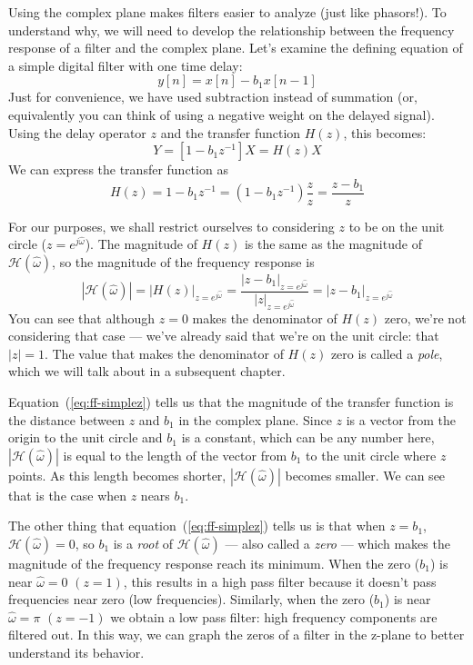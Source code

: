 Using the complex plane makes filters easier to analyze (just like phasors!). To understand why, we will need to develop the relationship between the frequency response of a filter and the complex plane. Let's examine the defining equation of a simple digital filter with
one time delay:
\begin{equation}
y[n] = x[n]-b_1x[n-1]
\end{equation}
Just for convenience, we have used subtraction instead of summation
(or, equivalently you can think of using a negative weight on the
delayed signal). Using the delay operator $z$ and the transfer
function $H(z)$, this becomes:
\begin{equation}
Y = [1-b_1z^{-1}]X = H(z)X
\end{equation}
We can express the transfer function as
\begin{equation}
H(z) = 1-b_1z^{-1} = (1-b_1z^{-1}) \frac{z}{z} = \frac{z-b_1}{z}
\end{equation}

For our purposes, we shall restrict ourselves to considering $z$ to be
on the unit circle ($z=e^{j\hat{\omega}}$). The magnitude of $H(z)$ is
the same as the magnitude of $\mathcal{H}(\hat{\omega})$, so the
magnitude of the frequency response is
\begin{equation}
|\mathcal{H}(\hat{\omega})| = |H(z)|_{z=e^{j\hat{\omega}}}
       = \frac{|z-b_1|_{z=e^{j\hat{\omega}}}}{|z|_{z=e^{j\hat{\omega}}}}
       = |z-b_1|_{z=e^{j\hat{\omega}}}
\label{eq:ff-simplez}
\end{equation}
You can see that
although $z=0$ makes the denominator of $H(z)$ zero, we're not
considering that case --- we've already said that we're on the unit
circle: that $|z|=1$.  The value that makes the denominator of
$H(z)$ zero is called a \emph{pole}, which we will talk
about in a subsequent chapter.

Equation~(\ref{eq:ff-simplez}) tells us that the magnitude of the
transfer function is the distance between $z$ and $b_1$ in the complex
plane.  Since $z$ is a vector from the origin to the unit circle and
$b_1$ is a constant, which can be any number here,
$|\mathcal{H}(\hat{\omega})|$ is equal to the length of the vector
from $b_1$ to the unit circle where $z$ points. As this length becomes
shorter, $|\mathcal{H}(\hat{\omega})|$ becomes smaller. We can see
that is the case when $z$ nears $b_1$.

The other thing that equation~(\ref{eq:ff-simplez}) tells us is that
when $z=b_1$, $\mathcal{H}(\hat{\omega})=0$, so $b_1$ is a \emph{root}
of $\mathcal{H}(\hat{\omega})$ --- also called a \emph{zero} --- which
makes the magnitude of the frequency response reach its
minimum.
When the zero ($b_1$) is near $\hat{\omega}=0$ $(z=1)$,
this results in a high pass filter because it doesn't pass frequencies
near zero (low frequencies). Similarly, when the zero ($b_1$) is near
$\hat{\omega}=\pi$ $(z=-1)$ we obtain a low pass filter: high frequency
components are filtered out. In this way, we can graph the zeros of a filter in the z-plane to better understand its behavior. 

